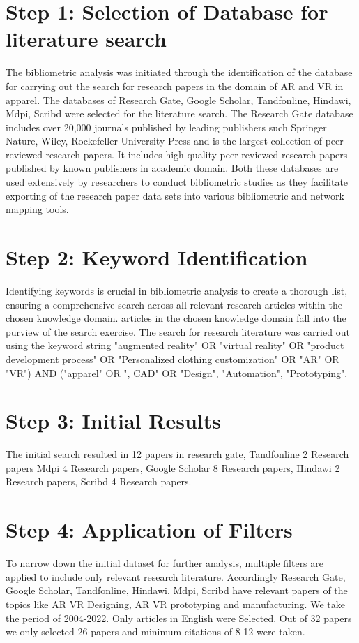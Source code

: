\documentclass[10pt]{article}
\begin{document}
\section*{Step 1: Selection of Database for literature search}
The bibliometric analysis was initiated through the identification of the database for carrying out the search for research papers in the domain of AR and VR in apparel. The databases of Research Gate, Google Scholar, Tandfonline, Hindawi, Mdpi, Scribd were selected for the literature search. The Research Gate database includes over 20,000 journals published by leading publishers such Springer Nature, Wiley, Rockefeller University Press and is the largest collection of peer-reviewed research papers. It includes high-quality peer-reviewed research papers published by known publishers in academic domain. Both these databases are used extensively by researchers to conduct bibliometric studies as they facilitate exporting of the research paper data sets into various bibliometric and network mapping tools.

\section*{Step 2: Keyword Identification}
Identifying keywords is crucial in bibliometric analysis to create a thorough list, ensuring a comprehensive search across all relevant research articles within the chosen knowledge domain. articles in the chosen knowledge domain fall into the purview of the search exercise. The search for research literature was carried out using the keyword string "augmented reality" OR "virtual reality" OR "product development process" OR "Personalized clothing customization" OR "AR" OR "VR") AND ("apparel" OR ", CAD" OR "Design", "Automation", "Prototyping".

\section*{Step 3: Initial Results}
The initial search resulted in 12 papers in research gate, Tandfonline 2 Research papers Mdpi 4 Research papers, Google Scholar 8 Research papers, Hindawi 2 Research papers, Scribd 4 Research papers.

\section*{Step 4: Application of Filters}
To narrow down the initial dataset for further analysis, multiple filters are applied to include only relevant research literature. Accordingly Research Gate, Google Scholar, Tandfonline, Hindawi, Mdpi, Scribd have relevant papers of the topics like AR VR Designing, AR VR prototyping and manufacturing. We take the period of 2004-2022. Only articles in English were Selected. Out of 32 papers we only selected 26 papers and minimum citations of 8-12 were taken.
\end{document}
